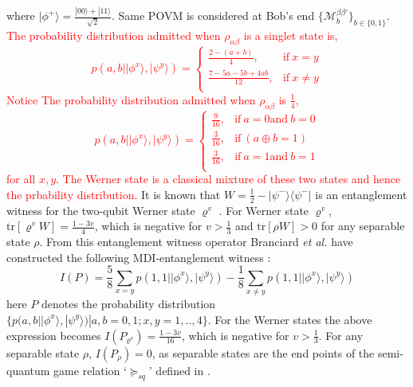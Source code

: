 \documentclass[doublecol,linenumbers]{epl2} %
\begin{document}
where $|\phi^+\rangle=\frac{|00\rangle+|11\rangle}{\sqrt{2}}$. Same POVM is considered at Bob's end $\{\mathcal{M}^{\beta\beta'}_b\}_{b\in \{0,1\}}$. \textcolor{red}{The probability distribution admitted when $\rho_{\alpha\beta}$ is a singlet state is,
\begin{equation}\label{p1}
p(a,b||\phi^x\rangle,|\psi^y\rangle)=    \begin{cases}
\frac{2-(a+b)}{4}, & \text{if}\ x=y\\
\frac{7-5a-5b+4ab}{12}, & \text{if}\ x \neq y\\
\end{cases}
\end{equation}
Notice The probability distribution admitted when $\rho_{\alpha\beta}$ is $\frac{\mathbb{I}}{4}$,
\begin{equation}\label{p2}
p(a,b||\phi^x\rangle,|\psi^y\rangle)=    \begin{cases}
\frac{9}{16}, & \text{if}\ a=0 \text{and}\ b=0\\
\frac{3}{16}, & \text{if}\ (a \oplus b=1) \\
\frac{3}{16}, & \text{if}\ a=1 \text{and}\ b=1 \\
\end{cases}
\end{equation}
for all $x,y$. The Werner state is a classical mixture of these two states and hence the prbability distribution. 
}
It is known that $W=\frac{\mathbb{I}}{2}-|\psi^-\rangle\langle\psi^-|$ is an entanglement witness for the two-qubit Werner state $\varrho^v$ \cite{Toth}. For Werner state $\varrho^v$, $\mbox{tr}[\varrho^vW]=\frac{1-3v}{4}$, which is negative for $v>\frac{1}{3}$ and $\mbox{tr}[\rho W]>0$ for any separable state $\rho$. From this entanglement witness operator Branciard \emph{et al.} have constructed the following MDI-entanglement witness \cite{Branciard}:
\begin{equation}\label{mdi-ew}
I(P)=\frac{5}{8}\sum_{x= y}p(1,1||\phi^x\rangle,|\psi^y\rangle)-\frac{1}{8}\sum_{x\ne y}p(1,1||\phi^x\rangle,|\psi^y\rangle)
\end{equation}     
here $P$ denotes the probability distribution $\{p(a,b||\phi^x\rangle,|\psi^y\rangle)|a,b=0,1;x,y=1,..,4\}$. For the Werner states the above expression becomes $I(P_{\varrho^v})=\frac{1-3v}{16}$, which is negative for $v>\frac{1}{3}$. For any separable state $\rho$, $I(P_{\rho})=0$, as separable states are the end points of the semi-quantum game relation `$\succcurlyeq_{sq}$' defined in \cite{Buscemi}.  
\end{document}
